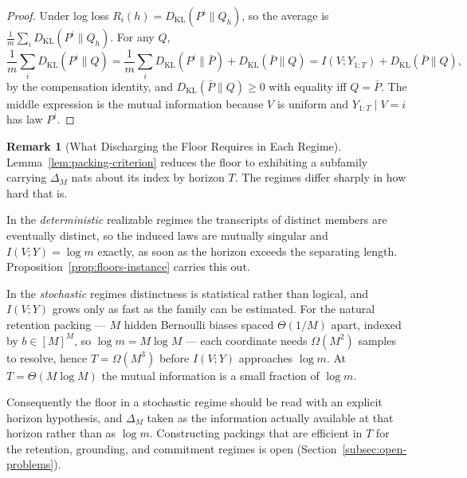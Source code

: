 \documentclass[12pt]{article}
\theoremstyle{definition}
\newtheorem{remark}[theorem]{Remark}
\newcommand{\KL}{D_{\mathrm{KL}}}
\begin{document}
\begin{proof}
Under log loss $R_i(h)=\KL(P^i\|Q_h)$, so the average is
$\frac1m\sum_i\KL(P^i\|Q_h)$.  For any $Q$,
\[
\frac1m\sum_i\KL(P^i\|Q)
=
\frac1m\sum_i\KL(P^i\|\bar P)+\KL(\bar P\|Q)
=
I(V;Y_{1:T})+\KL(\bar P\|Q),
\]
by the compensation identity, and $\KL(\bar P\|Q)\ge0$ with equality iff
$Q=\bar P$.  The middle expression is the mutual information because $V$ is
uniform and $Y_{1:T}\mid V=i$ has law $P^i$.
\end{proof}

\begin{remark}[What Discharging the Floor Requires in Each Regime]
\label{rem:packing-per-regime}
Lemma~\ref{lem:packing-criterion} reduces the floor to exhibiting a subfamily
carrying $\Delta_M$ nats about its index by horizon $T$.  The regimes differ
sharply in how hard that is.

In the \emph{deterministic} realizable regimes the transcripts of distinct
members are eventually distinct, so the induced laws are mutually singular and
$I(V;Y)=\log m$ exactly, as soon as the horizon exceeds the separating length.
Proposition~\ref{prop:floors-instance} carries this out.

In the \emph{stochastic} regimes distinctness is statistical rather than
logical, and $I(V;Y)$ grows only as fast as the family can be estimated.  For
the natural retention packing --- $M$ hidden Bernoulli biases spaced
$\Theta(1/M)$ apart, indexed by $b\in[M]^M$, so $\log m=M\log M$ --- each
coordinate needs $\Omega(M^2)$ samples to resolve, hence
$T=\Omega(M^3)$ before $I(V;Y)$ approaches $\log m$.  At $T=\Theta(M\log M)$
the mutual information is a small fraction of $\log m$.

Consequently the floor in a stochastic regime should be read with an explicit
horizon hypothesis, and $\Delta_M$ taken as the information actually available
at that horizon rather than as $\log m$.  Constructing packings that are
efficient in $T$ for the retention, grounding, and commitment regimes is open
(Section~\ref{subsec:open-problems}).
\end{remark}
\end{document}
